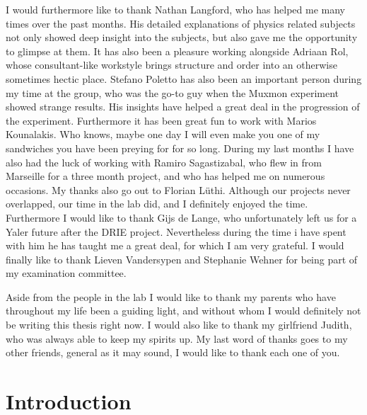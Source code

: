 \documentclass[12pt]{report}
\newcommand\blankpage{%
    \null
    \thispagestyle{empty}%
    \addtocounter{page}{-1}%
    \newpage}
\begin{document}
I would furthermore like to thank Nathan Langford, who has helped me many times over the past months. His detailed explanations of physics related subjects not only showed deep insight into the subjects, but also gave me the opportunity to glimpse at them. It has also been a pleasure working alongside Adriaan Rol, whose consultant-like workstyle brings structure and order into an otherwise sometimes hectic place. Stefano Poletto has also been an important person during my time at the group, who was the go-to guy when the Muxmon experiment showed strange results. His insights have helped a great deal in the progression of the experiment. Furthermore it has been great fun to work with Marios Kounalakis. Who knows, maybe one day I will even make you one of my sandwiches you have been preying for for so long. During my last months I have also had the luck of working with Ramiro Sagastizabal, who flew in from Marseille for a three month project, and who has helped me on numerous occasions. My thanks also go out to Florian L\"uthi. Although our projects never overlapped, our time in the lab did, and I definitely enjoyed the time. Furthermore I would like to thank Gijs de Lange, who unfortunately left us for a Yaler future after the DRIE project. Nevertheless during the time i have spent with him he has taught me a great deal, for which I am very grateful. I would finally like to thank Lieven Vandersypen and Stephanie Wehner for being part of my examination committee.

Aside from the people in the lab I would like to thank my parents who have throughout my life been a guiding light, and without whom I would definitely not be writing this thesis right now. I would also like to thank my girlfriend Judith, who was always able to keep my spirits up. My last word of thanks goes to my other friends, general as it may sound, I would like to thank each one of you.


\blankpage
\blankpage
\tableofcontents
\newpage

\sectionfont{\scshape}



\chapter{Introduction}
\end{document}
